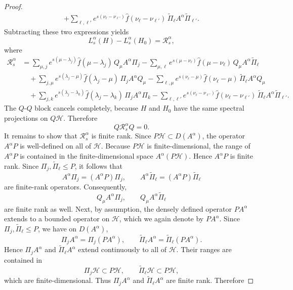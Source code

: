\documentclass[11pt]{amsart}
\newcommand{\1}{\mathbbm{1}}
\theoremstyle{plain}
\theoremstyle{definition}
\theoremstyle{remark}
\numberwithin{equation}{section}
\begin{document}
\begin{proof}
\[\begin{aligned}
+\sum_{\ell,\ell'} e^{s(\nu_\ell-\nu_{\ell'})}\widehat f(\nu_\ell-\nu_{\ell'})\,\widetilde\Pi_\ell A^\alpha \widetilde\Pi_{\ell'} .
\end{aligned}
\]
Subtracting these two expressions yields
\[
L_s^\alpha(H)-L_s^\alpha(H_0)=\mathcal R_s^\alpha,
\]
where
\[
\begin{aligned}
\mathcal R_s^\alpha
&=
\sum_{\mu,j} e^{s(\mu-\lambda_j)}\widehat f(\mu-\lambda_j)\,Q_\mu A^\alpha \Pi_j
-\sum_{\mu,\ell} e^{s(\mu-\nu_\ell)}\widehat f(\mu-\nu_\ell)\,Q_\mu A^\alpha \widetilde\Pi_\ell \\
&\quad
+\sum_{j,\mu} e^{s(\lambda_j-\mu)}\widehat f(\lambda_j-\mu)\,\Pi_j A^\alpha Q_\mu
-\sum_{\ell,\mu} e^{s(\nu_\ell-\mu)}\widehat f(\nu_\ell-\mu)\,\widetilde\Pi_\ell A^\alpha Q_\mu \\
&\quad
+\sum_{j,k} e^{s(\lambda_j-\lambda_k)}\widehat f(\lambda_j-\lambda_k)\,\Pi_j A^\alpha \Pi_k
-\sum_{\ell,\ell'} e^{s(\nu_\ell-\nu_{\ell'})}\widehat f(\nu_\ell-\nu_{\ell'})\,\widetilde\Pi_\ell A^\alpha \widetilde\Pi_{\ell'}.
\end{aligned}
\]
The \(Q\)-\(Q\) block cancels completely, because \(H\) and \(H_0\) have the same spectral projections on \(Q\mathcal H\). Therefore
\[
Q\mathcal R_s^\alpha Q=0.
\]
It remains to show that \(\mathcal R_s^\alpha\) is finite rank. Since \(P\mathcal H\subset D(A^\alpha)\), the operator \(A^\alpha P\) is well-defined on all of \(\mathcal H\). Because \(P\mathcal H\) is finite-dimensional, the range of \(A^\alpha P\) is contained in the finite-dimensional space \(A^\alpha(P\mathcal H)\). Hence \(A^\alpha P\) is finite rank. Since \(\Pi_j,\widetilde\Pi_\ell\le P\), it follows that
\[
A^\alpha \Pi_j=(A^\alpha P)\Pi_j,
\qquad
A^\alpha \widetilde\Pi_\ell=(A^\alpha P)\widetilde\Pi_\ell
\]
are finite-rank operators. Consequently,
\[
Q_\mu A^\alpha \Pi_j,
\qquad
Q_\mu A^\alpha \widetilde\Pi_\ell
\]
are finite rank as well. Next, by assumption, the densely defined operator \(PA^\alpha\) extends to a bounded operator on \(\mathcal H\), which we again denote by \(PA^\alpha\). Since \(\Pi_j,\widetilde\Pi_\ell\le P\), we have on \(D(A^\alpha)\),
\[
\Pi_j A^\alpha=\Pi_j(PA^\alpha),
\qquad
\widetilde\Pi_\ell A^\alpha=\widetilde\Pi_\ell(PA^\alpha).
\]
Hence \(\Pi_j A^\alpha\) and \(\widetilde\Pi_\ell A^\alpha\) extend continuously to all of \(\mathcal H\). Their ranges are contained in
\[
\Pi_j\mathcal H\subset P\mathcal H,
\qquad
\widetilde\Pi_\ell\mathcal H\subset P\mathcal H,
\]
which are finite-dimensional. Thus \(\Pi_j A^\alpha\) and \(\widetilde\Pi_\ell A^\alpha\) are finite rank. Therefore

\end{proof}
\end{document}
